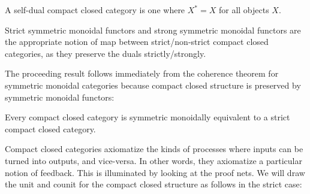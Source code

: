 \begin{definition}
A self-dual compact closed category is one where $X^*=X$ for all objects $X$.

Strict symmetric monoidal functors and strong symmetric monoidal functors are the appropriate notion of map between strict/non-strict compact closed categories, as they preserve the duals strictly/strongly.
\end{definition}
The proceeding result follows immediately from the coherence theorem for symmetric monoidal categories because compact closed structure is preserved by symmetric monoidal functors:
\begin{theorem}
Every compact closed category is  symmetric monoidally equivalent to a strict compact closed category. 
\end{theorem}
Compact closed categories axiomatize the kinds of processes where inputs can be turned into outputs, and vice-versa.  In other words, they axiomatize a particular notion of feedback.  This is illuminated by looking at the proof nets.
We will draw the unit and counit for the compact closed structure as follows in the strict case:
%
%

